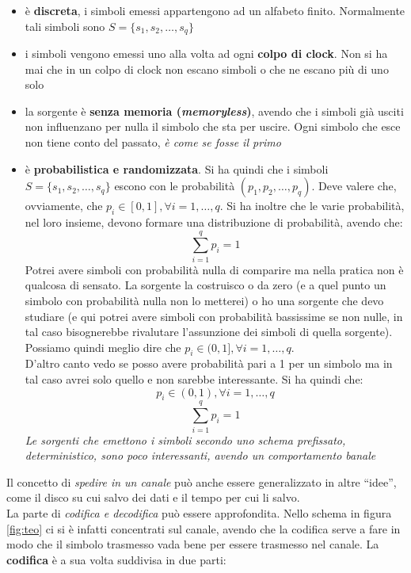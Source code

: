 \documentclass[a4paper,12pt, oneside]{book}
\begin{document}
\begin{itemize}
  \item è \textbf{discreta}, i simboli emessi appartengono ad un alfabeto
  finito. Normalmente tali simboli sono $S=\{s_1, s_2,\ldots,s_q\}$
  \item i simboli vengono emessi uno alla volta ad ogni \textbf{colpo di
    clock}. Non si ha mai che in un colpo di clock non escano simboli o che ne
  escano più di uno solo 
  \item la sorgente è \textbf{senza memoria (\textit{memoryless})}, avendo che
  i simboli già usciti non influenzano per nulla il simbolo che sta per
  uscire. Ogni simbolo che esce non tiene conto del passato, \textit{è come se
    fosse il primo}
  \item è \textbf{probabilistica e randomizzata}. Si ha quindi che i simboli
  $S=\{s_1, s_2,\ldots,s_q\}$ escono con le probabilità
  $(p_1,p_2,\ldots,p_q)$. Deve valere che, ovviamente, che $p_i\in
  [0,1],\forall
  i=1,\ldots,q$. Si ha inoltre che le varie probabilità, nel loro insieme,
  devono formare una distribuzione di probabilità, avendo che:
  \[\sum_{i=1}^q p_i=1\]
  Potrei avere simboli con probabilità nulla di comparire ma nella pratica non
  è qualcosa di sensato. La sorgente la costruisco o da zero (e a quel punto
  un simbolo con probabilità nulla non lo metterei) o ho una sorgente che devo
  studiare (e qui potrei avere simboli con probabilità bassissime se non
  nulle, in tal caso bisognerebbe rivalutare l'assunzione dei simboli di
  quella sorgente). Possiamo quindi meglio dire che $p_i\in (0,1],\forall
  i=1,\ldots,q$.\\
  D'altro canto vedo se posso avere probabilità pari a 1 per un simbolo ma in
  tal caso avrei solo quello e non sarebbe interessante. Si ha quindi che:
  \[p_i\in (0,1),\forall i=1,\ldots,q\]
  \[\sum_{i=1}^q p_i=1\]
  \textit{Le sorgenti che emettono i simboli secondo  
    uno schema prefissato, deterministico, sono poco interessanti, avendo un
    comportamento banale}
\end{itemize}
Il concetto di \textit{spedire in un canale} può anche essere generalizzato in
altre ``idee'', come il disco su cui salvo dei dati e il tempo per cui li
salvo.\\ 
La parte di \textit{codifica e decodifica} può essere approfondita. Nello schema
in figura \ref{fig:teo} ci si è infatti concentrati sul canale, avendo che la
codifica serve a fare in modo che il simbolo trasmesso vada bene per essere
trasmesso nel canale. La \textbf{codifica} è a sua volta suddivisa in due parti:
\end{document}

